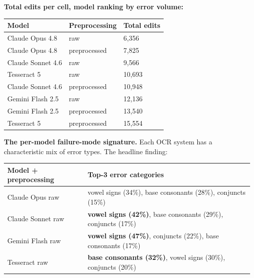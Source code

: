 \documentclass[
  letterpaper,
  DIV=11,
  numbers=noendperiod]{scrartcl}
\newcounter{none} %
\begin{document}
\textbf{Total edits per cell, model ranking by error volume:}

{\def\LTcaptype{none} %
\begin{longtable}[]{@{}lll@{}}
\toprule\noalign{}
Model & Preprocessing & Total edits \\
\midrule\noalign{}
\endhead
\bottomrule\noalign{}
\endlastfoot
Claude Opus 4.8 & raw & 6,356 \\
Claude Opus 4.8 & preprocessed & 7,825 \\
Claude Sonnet 4.6 & raw & 9,566 \\
Tesseract 5 & raw & 10,693 \\
Claude Sonnet 4.6 & preprocessed & 10,948 \\
Gemini Flash 2.5 & raw & 12,136 \\
Gemini Flash 2.5 & preprocessed & 13,540 \\
Tesseract 5 & preprocessed & 15,554 \\
\end{longtable}
}

\textbf{The per-model failure-mode signature.} Each OCR system has a
characteristic mix of error types. The headline finding:

{\def\LTcaptype{none} %
\begin{longtable}[]{@{}
  >{\raggedright\arraybackslash}p{}
  >{\raggedright\arraybackslash}p{}@{}}
\toprule\noalign{}
\begin{minipage}[b]{\linewidth}\raggedright
Model + preprocessing
\end{minipage} & \begin{minipage}[b]{\linewidth}\raggedright
Top-3 error categories
\end{minipage} \\
\midrule\noalign{}
\endhead
\bottomrule\noalign{}
\endlastfoot
Claude Opus raw & vowel signs (34\%), base consonants (28\%), conjuncts
(15\%) \\
Claude Sonnet raw & \textbf{vowel signs (42\%)}, base consonants (29\%),
conjuncts (17\%) \\
Gemini Flash raw & \textbf{vowel signs (47\%)}, conjuncts (22\%), base
consonants (17\%) \\
Tesseract raw & \textbf{base consonants (32\%)}, vowel signs (30\%),
conjuncts (20\%) \\
\end{longtable}
}
\end{document}
